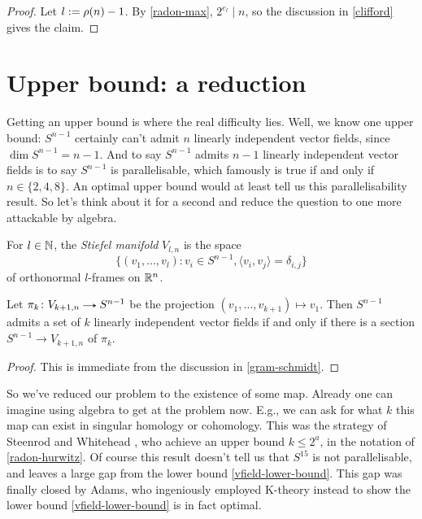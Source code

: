 \begin{proof}
  Let $l \mathrel{:=} \rho(n)-1$. By \eqref{radon-max}, $2^{e_l} \mid n$, so the
  discussion in \eqref{clifford} gives the claim.
\end{proof}


\section{Upper bound: a reduction}

Getting an upper bound is where the real difficulty lies. Well, we
know one upper bound: $S^{n-1}$ certainly can't admit $n$ linearly
independent vector fields, since $\dim S^{n-1} = n - 1$. And to say
$S^{n-1}$ admits $n-1$ linearly independent vector fields is to say
$S^{n-1}$ is parallelisable, which famously is true if and only if $n
\in \{2,4,8\}$. An optimal upper bound would at least tell us this
parallelisability result. So let's think about it for a second and
reduce the question to one more attackable by algebra.

\begin{definition}
  \label{stiefel}
  For $l \in \mathbb{N}$, the \emph{Stiefel manifold} $V_{l,n}$ is the space
  \[
  \{(v_1,\ldots,v_l) : v_i \in S^{n-1}, \langle v_i, v_j \rangle =
  \delta_{i,j}\}
  \]
  of orthonormal $l$-frames on $\mathbb{R}^n$.
\end{definition}

\begin{lemma}
  \label{section-reduction}
  Let $\pi_k \c V_{k+1,n} \to S^{n-1}$ be the projection
  $(v_1,\ldots,v_{k+1}) \mapsto v_1$. Then $S^{n-1}$ admits a set of
  $k$ linearly independent vector fields if and only if there is a
  section $S^{n-1} \to V_{k+1,n}$ of $\pi_k$.
\end{lemma}

\begin{proof}
  This is immediate from the discussion in \eqref{gram-schmidt}.
\end{proof}

So we've reduced our problem to the existence of some map. Already one
can imagine using algebra to get at the problem now. E.g., we can ask
for what $k$ this map can exist in singular homology or
cohomology. This was the strategy of Steenrod and Whitehead
\cite{steenrod-vfields}, who achieve an upper bound $k \le 2^a$, in
the notation of \eqref{radon-hurwitz}. Of course this result doesn't
tell us that $S^{15}$ is not parallelisable, and leaves a large gap
from the lower bound \eqref{vfield-lower-bound}. This gap was finally
closed by Adams, who ingeniously employed K-theory instead to show the
lower bound \eqref{vfield-lower-bound} is in fact optimal.

